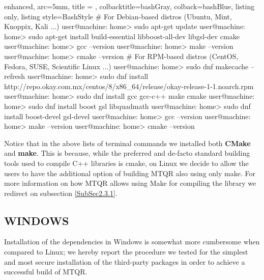 \documentclass[a4paper, twosided]{book}
\begin{document}
\vspace{0.2cm}
\begin{tcblisting}{enhanced,
                   arc=5mm,
                   title = \color{black}{\large \ttfamily Installation of third-party libraries (Linux)},
                   colbacktitle=bashGray,
                   colback=bashBlue,
                   listing only,
                   listing style=BashStyle}
# For Debian-based distros (Ubuntu, Mint, Knoppix, Kali ...)
user@machine: home> sudo apt-get update
user@machine: home> sudo apt-get install build-essential libboost-all-dev libgsl-dev cmake
user@machine: home> gcc --version
user@machine: home> make --version
user@machine: home> cmake --version
# For RPM-based distros (CentOS, Fedora, SUSE, Scientific Linux ...)
user@machine: home> sudo dnf makecache --refresh
user@machine: home> sudo dnf install http://repo.okay.com.mx/centos/8/x86_64/release/okay-release-1-1.noarch.rpm
user@machine: home> sudo dnf install gcc gcc-c++ make cmake
user@machine: home> sudo dnf install boost gsl libquadmath
user@machine: home> sudo dnf install boost-devel gsl-devel
user@machine: home> gcc --version
user@machine: home> make --version
user@machine: home> cmake --version
\end{tcblisting}
\vspace{0.3cm}

\noindent
Notice that in the above lists of terminal commands we installed both \color{poliDarkBlue} \textbf{CMake} and \color{poliDarkBlue} \textbf{make}. This is because, while the preferred and de-facto standard building tools used to compile C++ libraries is \colorbox{poliGrayBlue}{cmake}, on Linux we decide to allow the users to have the additional option of building MTQR also using only \colorbox{poliGrayBlue}{make}. For more information on how MTQR allows using Make for compiling the library we redirect on subsection \ref{SubSec2.3.1}.

\subsection[Windows]{\changefont WINDOWS}\label{SubSec2.1.2}

Installation of the dependencies in Windows is somewhat more cumbersome when compared to Linux; we hereby report the procedure we tested for the simplest and most secure installation of the third-party packages in order to achieve a successful build of MTQR.
\end{document}
